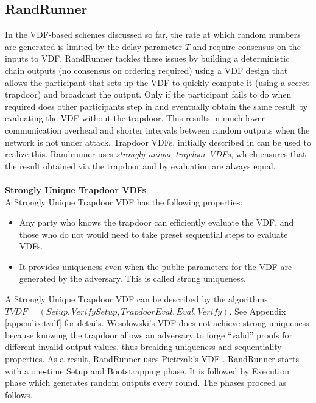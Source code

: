 \documentclass[letterpaper,twocolumn,10pt]{article}
\theoremstyle{definition}
\theoremstyle{remark}
\begin{document}
\subsection{RandRunner}
In the VDF-based schemes discussed so far, the rate at which random numbers are generated is limited by the delay parameter $T$ and require consensus on the inputs to VDF. RandRunner \cite{schindler2021randrunner} tackles these issues by building a deterministic chain outputs (no consensus on ordering required) using a VDF design that allows the participant that sets up the VDF to quickly compute it (using a secret trapdoor) and broadcast the output. Only if the participant fails to do when required does other participants step in and eventually obtain the same result by evaluating the VDF without the trapdoor. This results in much lower communication overhead and shorter intervals between random outputs when the network is not under attack. Trapdoor VDFs, initially described in \cite{wesolowski2019efficient} can be used to realize this. Randrunner uses \emph{strongly unique trapdoor VDFs}, which ensures that the result obtained via the trapdoor and by evaluation are always equal.\\\\
\textbf{Strongly Unique Trapdoor VDFs}\\
A Strongly Unique Trapdoor VDF has the following properties:
\begin{itemize}
    \item Any party who knows the trapdoor can efficiently evaluate the VDF, and those who do not would need to take preset sequential steps to evaluate VDFs.
    \item It provides uniqueness even when the public parameters for the VDF are generated by the adversary. This is called strong uniqueness. 
\end{itemize}
A Strongly Unique Trapdoor VDF can be described by the algorithms $TVDF = (Setup,VerifySetup, TrapdoorEval, Eval, Verify)$. See Appendix \ref{appendix:tvdf} for details. Wesolowski’s VDF \cite{wesolowski2019efficient} does not achieve strong uniqueness because knowing the trapdoor allows an adversary to forge ``valid'' proofs for different invalid output values, thus breaking uniqueness and sequentiality properties. As a result, RandRunner uses Pietrzak's VDF \cite{pietrzak2018simple}. RandRunner starts with a one-time Setup and Bootstrapping phase. It is followed by Execution phase which generates random outputs every round. The phases proceed as follows.
\end{document}
